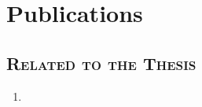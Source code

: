 \chapter*{Publications} \label{pub:pub01}

\section*{\fontsize{12pt}{16pt}\scshape Related to the Thesis}

\begin{enumerate}
    \item {}
\end{enumerate}



